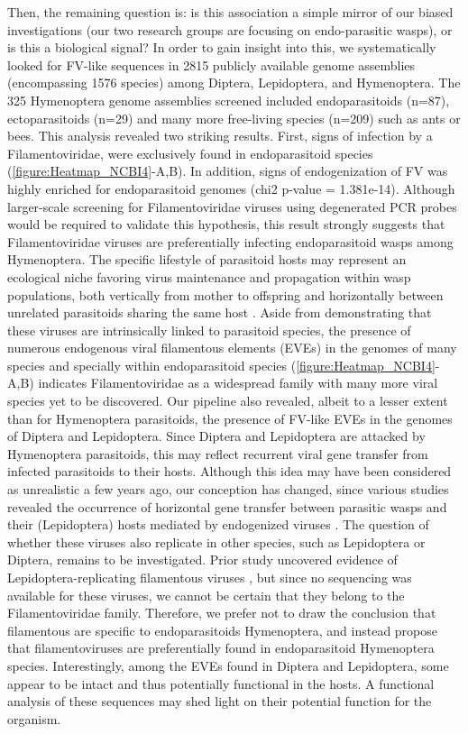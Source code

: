 Then, the remaining question is: is this association a simple mirror of our biased investigations (our two research groups are focusing on endo-parasitic wasps), or is this a biological signal? In order to gain insight into this, we systematically looked for FV-like sequences in 2815 publicly available genome assemblies (encompassing 1576 species) among Diptera, Lepidoptera, and Hymenoptera. The 325 Hymenoptera genome assemblies screened included endoparasitoids (n=87), ectoparasitoids (n=29) and many more free-living species (n=209) such as ants or bees. This analysis revealed two striking results. First, signs of infection by a Filamentoviridae, were exclusively found in endoparasitoid species (\figurename{\ref{figure:Heatmap_NCBI4}}-A,B). In addition, signs of endogenization of FV was highly enriched for endoparasitoid genomes (chi2 p-value = 1.381e-14).  Although larger-scale screening for Filamentoviridae viruses using degenerated PCR probes would be required to validate this hypothesis, this result strongly suggests that Filamentoviridae viruses are preferentially infecting endoparasitoid wasps among Hymenoptera. The specific lifestyle of parasitoid hosts may represent an ecological niche favoring virus maintenance and propagation within wasp populations, both vertically from mother to offspring \citep{martinez_additional_2016} and horizontally between unrelated parasitoids sharing the same host \citep{varaldi_infectious_2003}. Aside from demonstrating that these viruses are intrinsically linked to parasitoid species, the presence of numerous endogenous viral filamentous elements (EVEs) in the genomes of many species and specially within endoparasitoid species (\figurename{\ref{figure:Heatmap_NCBI4}}-A,B) indicates Filamentoviridae as a widespread family with many more viral species yet to be discovered. Our pipeline also revealed, albeit to a lesser extent than for Hymenoptera parasitoids, the presence of FV-like EVEs in the genomes of Diptera and Lepidoptera. Since Diptera and Lepidoptera are attacked by Hymenoptera parasitoids, this may reflect recurrent viral gene transfer from infected parasitoids to their hosts. Although this idea may have been considered as unrealistic a few years ago, our conception has changed, since various studies revealed the occurrence of horizontal gene transfer between parasitic wasps and their (Lepidoptera) hosts mediated by endogenized viruses \citep{gasmi_recurrent_2015,di_lelio_evolution_2019,muller_investigating_2022}. The question of whether these viruses also replicate in other species, such as Lepidoptera or Diptera, remains to be investigated. Prior study uncovered evidence of Lepidoptera-replicating filamentous viruses \citep{styer_new_1987}, but since no sequencing was available for these viruses, we cannot be certain that they belong to the Filamentoviridae family. Therefore, we prefer not to draw the conclusion that filamentous are specific to endoparasitoids Hymenoptera, and instead propose that filamentoviruses are preferentially found in endoparasitoid Hymenoptera species. Interestingly, among the EVEs found in Diptera and Lepidoptera, some appear to be intact and thus potentially functional in the hosts. A functional analysis of these sequences may shed light on their potential function for the organism. 



